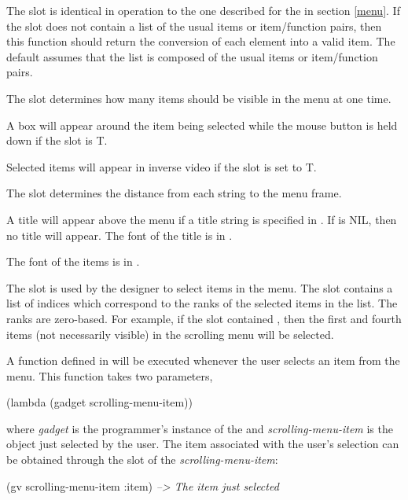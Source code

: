 The  slot is identical in operation to the one
described for the  in section \ref{menu}.
If the  slot does not contain a list of the usual items or
item/function pairs, then this function should return the conversion of each
element into a valid item.
The default  assumes that the  list
is composed of the usual items or item/function pairs.

The slot  determines how many items should be visible
in the menu at one time.

A box will appear around the item being selected while the mouse
button is held down if the slot  is T.

Selected items will appear in inverse video if the slot
 is set to T.

The slot  determines the distance from each string to
the menu frame.

A title will appear above the menu if a title string is specified in
.  If  is NIL, then no title will appear.  The
font of the title is in .

The font of the items is in .

The  slot is used by the designer to select items
in the menu.  The slot contains a list of indices which correspond to
the ranks of the selected items in the  list.  The ranks
are zero-based.  For example, if the  slot
contained , then the first and fourth items (not
necessarily visible) in the scrolling menu will be selected.

A function defined in  will be executed
whenever the user selects an item from the menu.  This function takes
two parameters,
\begin{programexample}
(lambda (gadget scrolling-menu-item))
\end{programexample}
 where {\it gadget} is the programmer's instance of
the  and {\it scrolling-menu-item} is the object just
selected by the user.  The item associated with the user's selection
can be obtained through the  slot of the
{\it scrolling-menu-item}:
\begin{programexample}
(gv scrolling-menu-item :item) {\it --> The item just selected}
\end{programexample}


